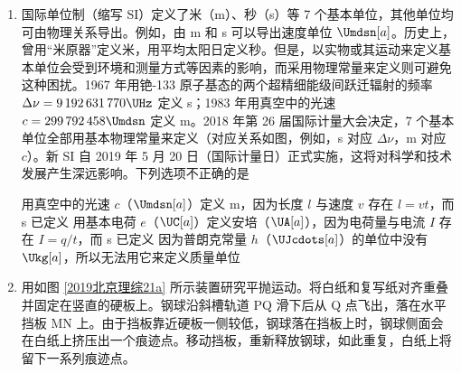 \documentclass[\gkver]{gaokaozhenti}
\begin{document}
\begin{enumerate}

\item
国际单位制（缩写 SI）定义了米（m）、秒（s）等 7 个基本单位，其他单位均可由物理关系导出。例如，由 m 和 s 可以导出速度单位 $\Umdsn[a]$。历史上，曾用“米原器”定义米，用平均太阳日定义秒。但是，以实物或其运动来定义基本单位会受到环境和测量方式等因素的影响，而采用物理常量来定义则可避免这种困扰。1967 年用铯-133 原子基态的两个超精细能级间跃迁辐射的频率 $\Delta\nu=9\,192\,631\,770\UHz$ 定义 s；1983 年用真空中的光速 $c=299\,792\,458\Umdsn$ 定义 m。2018 年第 26 届国际计量大会决定，7 个基本单位全部用基本物理常量来定义（对应关系如图，例如，s 对应 $\Delta\nu$，m 对应 $c$）。新 SI 自 2019 年 5 月 20 日（国际计量日）正式实施，这将对科学和技术发展产生深远影响。下列选项不正确的是


{用真空中的光速 $c$（$\Umdsn[a]$）定义 m，因为长度 $l$ 与速度 $v$ 存在 $l=vt$，而 s 已定义}
{用基本电荷 $e$（$\UC[a]$）定义安培（$\UA[a]$），因为电荷量与电流 $I$ 存在 $I=q/t$，而 s 已定义}
{因为普朗克常量 $h$（$\UJcdots[a]$）的单位中没有 $\Ukg[a]$，所以无法用它来定义质量单位}


\item
用如图 \ref{2019北京理综21a} 所示装置研究平抛运动。将白纸和复写纸对齐重叠并固定在竖直的硬板上。钢球沿斜槽轨道 PQ 滑下后从 Q 点飞出，落在水平挡板 MN 上。由于挡板靠近硬板一侧较低，钢球落在挡板上时，钢球侧面会在白纸上挤压出一个痕迹点。移动挡板，重新释放钢球，如此重复，白纸上将留下一系列痕迹点。


\end{enumerate}
\end{document}
